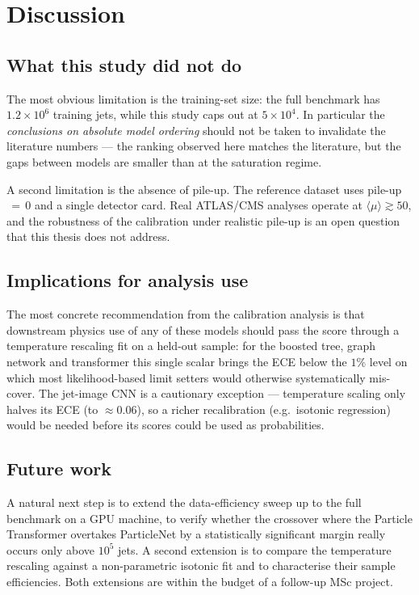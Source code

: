 \documentclass[12pt,a4paper,oneside]{report}
\begin{document}
\chapter{Discussion}\label{ch:discussion}

\section{What this study did not do}
The most obvious limitation is the training-set size: the full
benchmark has $1.2\!\times\!10^6$ training jets, while this study
caps out at $5\!\times\!10^4$.  In particular the
\emph{conclusions on absolute model ordering} should not be taken
to invalidate the literature numbers --- the ranking observed here
matches the literature, but the gaps between models are smaller
than at the saturation regime.

A second limitation is the absence of pile-up.  The reference
dataset uses pile-up$\,=\,0$ and a single detector card.  Real
ATLAS/CMS analyses operate at $\langle\mu\rangle\!\gtrsim\!50$, and
the robustness of the calibration under realistic pile-up is an
open question that this thesis does not address.

\section{Implications for analysis use}
The most concrete recommendation from the calibration analysis is
that downstream physics use of any of these models should pass the
score through a temperature rescaling fit on a held-out sample: for
the boosted tree, graph network and transformer this single scalar
brings the ECE below the $1\%$ level on which most likelihood-based
limit setters would otherwise systematically mis-cover.  The
jet-image CNN is a cautionary exception --- temperature scaling only
halves its ECE (to $\approx0.06$), so a richer recalibration (e.g.\
isotonic regression) would be needed before its scores could be used
as probabilities.

\section{Future work}
A natural next step is to extend the data-efficiency sweep up to
the full benchmark on a GPU machine, to verify whether the
crossover where the Particle Transformer overtakes ParticleNet by a
statistically significant margin really occurs only above
$10^5$ jets.  A second extension is to compare the temperature
rescaling against a non-parametric isotonic fit and to characterise
their sample efficiencies.  Both extensions are within the budget
of a follow-up MSc project.
\end{document}
